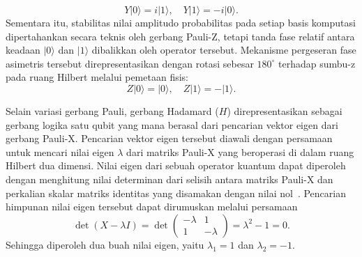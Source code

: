 \begin{equation}
\label{eq:aksi_pauliy}
Y|0\rangle = i|1\rangle, \quad Y|1\rangle = -i|0\rangle.
\end{equation}
Sementara itu, stabilitas nilai amplitudo probabilitas pada setiap basis komputasi dipertahankan secara teknis oleh gerbang Pauli-Z, tetapi tanda fase relatif antara keadaan $|0\rangle$ dan $|1\rangle$ dibalikkan oleh operator tersebut. Mekanisme pergeseran fase asimetris tersebut direpresentasikan dengan rotasi sebesar $180^\circ$ terhadap sumbu-z pada ruang Hilbert melalui pemetaan fisis:
\begin{equation}
\label{eq:aksi_pauliz}
Z|0\rangle = |0\rangle, \quad Z|1\rangle = -|1\rangle.
\end{equation}

Selain variasi gerbang Pauli, gerbang Hadamard ($H$) direpresentasikan sebagai gerbang logika satu qubit yang  mana berasal dari pencarian vektor eigen dari gerbang Pauli-X. Pencarian vektor eigen tersebut diawali dengan persamaan untuk mencari nilai eigen $\lambda$ dari matriks Pauli-X yang beroperasi di dalam ruang Hilbert dua dimensi. Nilai eigen dari sebuah operator kuantum dapat diperoleh dengan menghitung nilai determinan dari selisih antara matriks Pauli-X dan perkalian skalar matriks identitas yang disamakan dengan nilai nol~. Pencarian himpunan nilai eigen tersebut dapat dirumuskan melalui persamaan
\begin{equation}
\label{eq:eigen_value_x}
\det(X - \lambda I) = \det \begin{pmatrix} -\lambda & 1 \\ 1 & -\lambda \end{pmatrix} = \lambda^2 - 1 = 0.
\end{equation}
Sehingga diperoleh dua buah nilai eigen, yaitu $\lambda_1 = 1$ dan $\lambda_2 = -1$.

